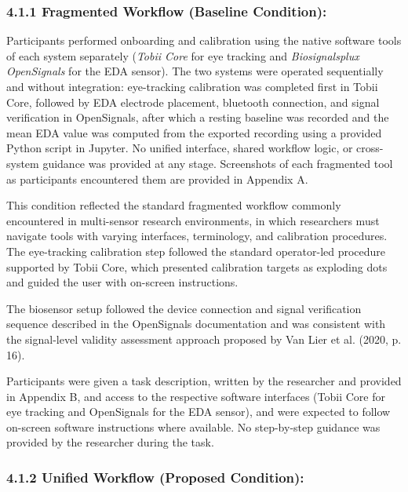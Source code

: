 \documentclass[
]{article}
\begin{document}
\hypertarget{fragmented-workflow-baseline-condition}{%
\subsubsection{\texorpdfstring{4.1.1 Fragmented Workflow (Baseline Condition): }{4.1.1 Fragmented Workflow (Baseline Condition): }}\label{fragmented-workflow-baseline-condition}}

Participants performed onboarding and calibration using the native software tools of each system separately (\emph{Tobii Core} for eye tracking and \emph{Biosignalsplux OpenSignals} for the EDA sensor). The two systems were operated sequentially and without integration: eye-tracking calibration was completed first in Tobii Core, followed by EDA electrode placement, bluetooth connection, and signal verification in OpenSignals, after which a resting baseline was recorded and the mean EDA value was computed from the exported recording using a provided Python script in Jupyter. No unified interface, shared workflow logic, or cross-system guidance was provided at any stage. Screenshots of each fragmented tool as participants encountered them are provided in Appendix A.

This condition reflected the standard fragmented workflow commonly encountered in multi-sensor research environments, in which researchers must navigate tools with varying interfaces, terminology, and calibration procedures. The eye-tracking calibration step followed the standard operator-led procedure supported by Tobii Core, which presented calibration targets as exploding dots and guided the user with on-screen instructions.

The biosensor setup followed the device connection and signal verification sequence described in the OpenSignals documentation and was consistent with the signal-level validity assessment approach proposed by Van Lier et al. (2020, p. 16).

Participants were given a task description, written by the researcher and provided in Appendix B, and access to the respective software interfaces (Tobii Core for eye tracking and OpenSignals for the EDA sensor), and were expected to follow on-screen software instructions where available. No step-by-step guidance was provided by the researcher during the task.

\hypertarget{unified-workflow-proposed-condition}{%
\subsubsection{\texorpdfstring{4.1.2 Unified Workflow (Proposed Condition): }{4.1.2 Unified Workflow (Proposed Condition): }}\label{unified-workflow-proposed-condition}}
\end{document}

